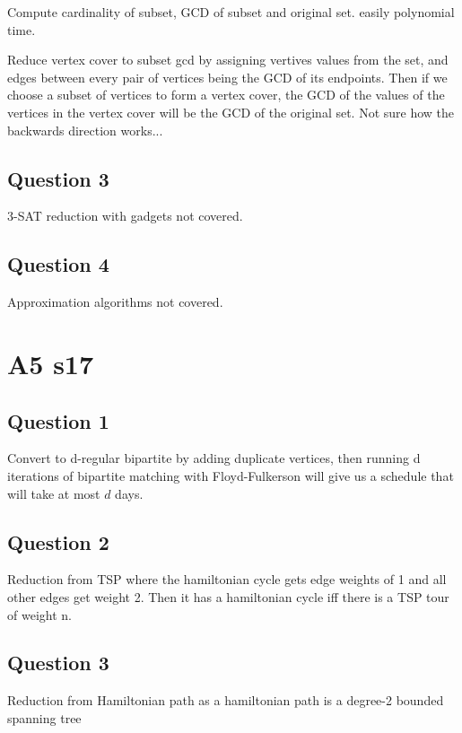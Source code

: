 \documentclass[11pt]{article}
\begin{document}
Compute cardinality of subset, GCD of subset and original set. easily polynomial time.

Reduce vertex cover to subset gcd by assigning vertives values from the set, and edges between every pair of vertices being the GCD of its endpoints. Then if we choose a subset of vertices to form a vertex cover, the GCD of the values of the vertices in the vertex cover will be the GCD of the original set. Not sure how the backwards direction works...

\subsection{Question 3}

3-SAT reduction with gadgets not covered.

\subsection{Question 4}

Approximation algorithms not covered.

\section{A5 s17}

\subsection{Question 1}

Convert to d-regular bipartite by adding duplicate vertices, then running d iterations of bipartite matching with Floyd-Fulkerson will give us a schedule that will take at most $d$ days.

\subsection{Question 2}

Reduction from TSP where the hamiltonian cycle gets edge weights of 1 and all other edges get weight 2. Then it has a hamiltonian cycle iff there is a TSP tour of weight n.

\subsection{Question 3}

Reduction from Hamiltonian path as a hamiltonian path is a degree-2 bounded spanning tree
\end{document}
